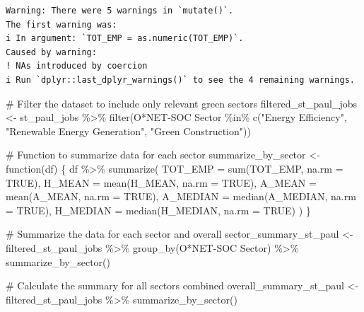\documentclass[
  letterpaper,
  DIV=11,
  numbers=noendperiod]{scrartcl}
\newenvironment{Shaded}{\begin{snugshade}}{\end{snugshade}}
\newcommand{\AttributeTok}[1]{\textcolor[rgb]{0.40,0.45,0.13}{#1}}
\newcommand{\CommentTok}[1]{\textcolor[rgb]{0.37,0.37,0.37}{#1}}
\newcommand{\ConstantTok}[1]{\textcolor[rgb]{0.56,0.35,0.01}{#1}}
\newcommand{\ControlFlowTok}[1]{\textcolor[rgb]{0.00,0.23,0.31}{#1}}
\newcommand{\FunctionTok}[1]{\textcolor[rgb]{0.28,0.35,0.67}{#1}}
\newcommand{\NormalTok}[1]{\textcolor[rgb]{0.00,0.23,0.31}{#1}}
\newcommand{\OtherTok}[1]{\textcolor[rgb]{0.00,0.23,0.31}{#1}}
\newcommand{\SpecialCharTok}[1]{\textcolor[rgb]{0.37,0.37,0.37}{#1}}
\newcommand{\StringTok}[1]{\textcolor[rgb]{0.13,0.47,0.30}{#1}}
\begin{document}
\begin{verbatim}
Warning: There were 5 warnings in `mutate()`.
The first warning was:
i In argument: `TOT_EMP = as.numeric(TOT_EMP)`.
Caused by warning:
! NAs introduced by coercion
i Run `dplyr::last_dplyr_warnings()` to see the 4 remaining warnings.
\end{verbatim}

\begin{Shaded}
\begin{Highlighting}[]
\CommentTok{\# Filter the dataset to include only relevant green sectors}
\NormalTok{filtered\_st\_paul\_jobs }\OtherTok{\textless{}{-}}\NormalTok{ st\_paul\_jobs }\SpecialCharTok{\%\textgreater{}\%}
  \FunctionTok{filter}\NormalTok{(}\StringTok{\textasciigrave{}}\AttributeTok{O*NET{-}SOC Sector}\StringTok{\textasciigrave{}} \SpecialCharTok{\%in\%} \FunctionTok{c}\NormalTok{(}\StringTok{"Energy Efficiency"}\NormalTok{, }\StringTok{"Renewable Energy Generation"}\NormalTok{, }\StringTok{"Green Construction"}\NormalTok{))}

\CommentTok{\# Function to summarize data for each sector}
\NormalTok{summarize\_by\_sector }\OtherTok{\textless{}{-}} \ControlFlowTok{function}\NormalTok{(df) \{}
\NormalTok{  df }\SpecialCharTok{\%\textgreater{}\%}
    \FunctionTok{summarize}\NormalTok{(}
      \AttributeTok{TOT\_EMP =} \FunctionTok{sum}\NormalTok{(TOT\_EMP, }\AttributeTok{na.rm =} \ConstantTok{TRUE}\NormalTok{),}
      \AttributeTok{H\_MEAN =} \FunctionTok{mean}\NormalTok{(H\_MEAN, }\AttributeTok{na.rm =} \ConstantTok{TRUE}\NormalTok{),}
      \AttributeTok{A\_MEAN =} \FunctionTok{mean}\NormalTok{(A\_MEAN, }\AttributeTok{na.rm =} \ConstantTok{TRUE}\NormalTok{),}
      \AttributeTok{A\_MEDIAN =} \FunctionTok{median}\NormalTok{(A\_MEDIAN, }\AttributeTok{na.rm =} \ConstantTok{TRUE}\NormalTok{),}
      \AttributeTok{H\_MEDIAN =} \FunctionTok{median}\NormalTok{(H\_MEDIAN, }\AttributeTok{na.rm =} \ConstantTok{TRUE}\NormalTok{)}
\NormalTok{    )}
\NormalTok{\}}

\CommentTok{\# Summarize the data for each sector and overall}
\NormalTok{sector\_summary\_st\_paul }\OtherTok{\textless{}{-}}\NormalTok{ filtered\_st\_paul\_jobs }\SpecialCharTok{\%\textgreater{}\%}
  \FunctionTok{group\_by}\NormalTok{(}\StringTok{\textasciigrave{}}\AttributeTok{O*NET{-}SOC Sector}\StringTok{\textasciigrave{}}\NormalTok{) }\SpecialCharTok{\%\textgreater{}\%}
  \FunctionTok{summarize\_by\_sector}\NormalTok{()}

\CommentTok{\# Calculate the summary for all sectors combined}
\NormalTok{overall\_summary\_st\_paul }\OtherTok{\textless{}{-}}\NormalTok{ filtered\_st\_paul\_jobs }\SpecialCharTok{\%\textgreater{}\%}
  \FunctionTok{summarize\_by\_sector}\NormalTok{()}


\end{Highlighting}
\end{Shaded}
\end{document}
